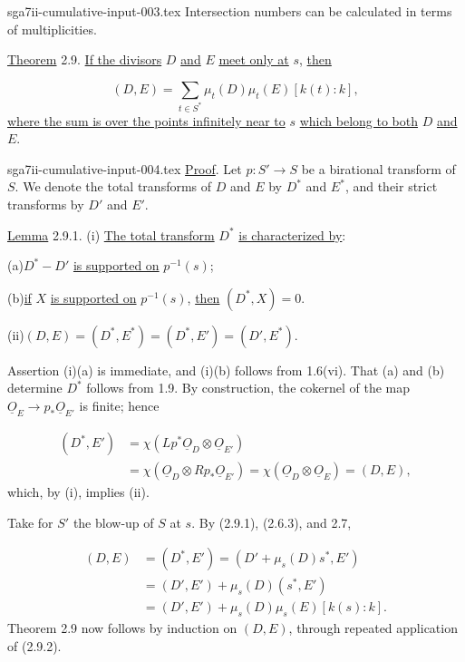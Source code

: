 \begin{filecontents*}{sga7ii-cumulative-input-003.tex}
Intersection numbers can be calculated in terms of multiplicities.

\underline{Theorem} 2.9. \underline{If the divisors} $D$ \underline{and} $E$
\underline{meet only at} $s$, \underline{then}

\begin{equation*}
(D,E)=\sum_{t\in S^*}\mu_t(D)\mu_t(E)[k(t):k],
\end{equation*}
\underline{where the sum is over the points infinitely near to} $s$
\underline{which belong to both} $D$ \underline{and} $E$.
\end{filecontents*}
\begin{filecontents*}{sga7ii-cumulative-input-004.tex}
\underline{Proof}. Let $p:S'\longrightarrow S$ be a birational transform of $S$.
We denote the total transforms of $D$ and $E$ by $D^*$ and $E^*$, and their
strict transforms by $D'$ and $E'$.


\underline{Lemma} 2.9.1. (i) \underline{The total transform} $D^*$
\underline{is characterized by}:

(a)\quad $D^*-D'$ \underline{is supported on} $p^{-1}(s)$;

(b)\quad \underline{if} $X$ \underline{is supported on} $p^{-1}(s)$,
\underline{then} $(D^*,X)=0$.

(ii)\quad $(D,E)=(D^*,E^*)=(D^*,E')=(D',E^*)$.

Assertion (i)(a) is immediate, and (i)(b) follows from 1.6(vi).  That (a) and (b)
determine $D^*$ follows from 1.9.  By construction, the cokernel of the map
$\underline{O}_E\longrightarrow p_*\underline{O}_{E'}$ is finite; hence

\begin{equation*}
\begin{aligned}
(D^*,E')
&=\chi(Lp^*\underline{O}_D\otimes\underline{O}_{E'})\\
&=\chi(\underline{O}_D\otimes Rp_*\underline{O}_{E'})
=\chi(\underline{O}_D\otimes\underline{O}_E)
=(D,E),
\end{aligned}
\end{equation*}
which, by (i), implies (ii).

Take for $S'$ the blow-up of $S$ at $s$.  By (2.9.1), (2.6.3), and 2.7,

\begin{equation}\tag{2.9.2}
\begin{aligned}
(D,E)
&=(D^*,E')
=(D'+\mu_s(D)s^*,E')\\
&=(D',E')+\mu_s(D)(s^*,E')\\
&=(D',E')+\mu_s(D)\mu_s(E)[k(s):k].
\end{aligned}
\end{equation}
Theorem 2.9 now follows by induction on $(D,E)$, through repeated application of
(2.9.2).


\end{filecontents*}
